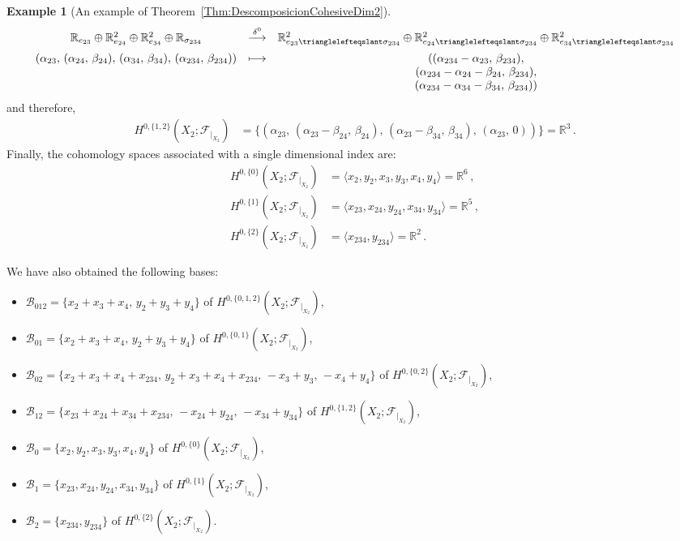 \documentclass[reqno,12pt]{amsart}
\newcommand{\face}{{\trianglelefteqslant}}
\newcommand{\R}{\mathbb{R}}
\newcommand{\cF}{{\mathcal F}}
\newcommand{\0}{\mathbf 0}
\theoremstyle{definition}
\newtheorem{example}[theorem]{Example}
\begin{document}
\begin{example}[An example of Theorem~\ref{Thm:DescomposicionCohesiveDim2}]
\[
\begin{array}{ccc}
     \R_{e_{23}}\oplus \R_{e_{24}}^2\oplus\R_{e_{34}}^2\oplus\R_{\sigma_{234}}& \stackrel{\delta^0}\longrightarrow & \R^2_{e_{23}\face \sigma_{234}}\oplus \R^2_{e_{24}\face \sigma_{234}}\oplus\R^2_{e_{34}\face \sigma_{234}} \\[1.5ex]
    (\alpha_{23},\,(\alpha_{24},\,\beta_{24}),\,(\alpha_{34},\,\beta_{34}),\,(\alpha_{234},\,\beta_{234}))& \longmapsto & ((\alpha_{234}-\alpha_{23},\,\beta_{234}),\\  & &(\alpha_{234}-\alpha_{24}-\beta_{24},\,\beta_{234}),\\ & & (\alpha_{234}-\alpha_{34}-\beta_{34},\,\beta_{234}))
\end{array}
\]
and therefore,
\[
\begin{aligned}
    H^{0,\{1,2\}}(X_2;\cF_{|_{X_2}})&=\{(\alpha_{23},\,(\alpha_{23}-\beta_{24},\,\beta_{24}),\,(\alpha_{23}-\beta_{34},\,\beta_{34}),\,(\alpha_{23},\,0))\}=\R^3\,.
\end{aligned}
\]
Finally, the cohomology spaces associated with a single dimensional index are:
\[
\begin{aligned}
    H^{0,\{0\}}(X_2;\cF_{|_{X_2}})& =\langle x_2, y_2, x_3,y_3, x_4,y_4\rangle =\R^6\,,\\[1.5ex]
    H^{0,\{1\}}(X_2;\cF_{|_{X_2}})&=\langle x_{23}, x_{24}, y_{24}, x_{34}, y_{34}\rangle=\R^5\,,\\[1.5ex]
    H^{0,\{2\}}(X_2;\cF_{|_{X_2}})&=\langle x_{234}, y_{234}\rangle =\R^2\,.
\end{aligned}
\]

We have also obtained the following bases:
\begin{itemize}
    \item $\mathcal{B}_{012}=\{x_2+x_3+x_4,\, y_2+y_3+y_4\}$ of $H^{0,\{0,1,2\}}(X_2;\cF_{|_{X_2}})$,
    \item $\mathcal{B}_{01}=\{x_2+x_3+x_4,\, y_2+y_3+y_4\}$ of $H^{0,\{0,1\}}(X_2;\cF_{|_{X_2}})$,
    \item $\mathcal{B}_{02}=\{x_2+x_3+x_4+x_{234},\, y_2+x_3+x_4+x_{234},\,-x_3+y_3,\,-x_4+y_4\}$ of $H^{0,\{0,2\}}(X_2;\cF_{|_{X_2}})$,
    \item $ \mathcal{B}_{12}=\{ x_{23}+x_{24}+x_{34}+x_{234},\,-x_{24}+y_{24},\,-x_{34}+y_{34}\}$ of $H^{0,\{1,2\}}(X_2;\cF_{|_{X_2}})$,
    \item $\mathcal{B}_{0}=\{ x_2, y_2, x_3,y_3, x_4,y_4\}$ of $H^{0,\{0\}}(X_2;\cF_{|_{X_2}})$,
    \item $\mathcal{B}_{1}=\{x_{23}, x_{24}, y_{24}, x_{34}, y_{34}\}$ of $H^{0,\{1\}}(X_2;\cF_{|_{X_2}})$,
    \item $\mathcal{B}_{2}=\{x_{234}, y_{234}\}$ of $H^{0,\{2\}}(X_2;\cF_{|_{X_2}})$.
\end{itemize}


\end{example}
\end{document}
